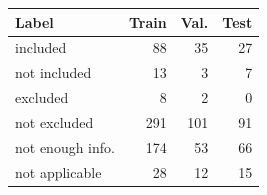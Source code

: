 \begin{tabular}{lrrr}\toprule
Label & Train & Val. & Test \\\midrule
included & 88 & 35 & 27 \\
not included & 13 & 3 & 7 \\
excluded & 8 & 2 & 0 \\
not excluded & 291 & 101 & 91 \\
not enough info. & 174 & 53 & 66 \\
not applicable & 28 & 12 & 15 \\
\bottomrule\end{tabular}
